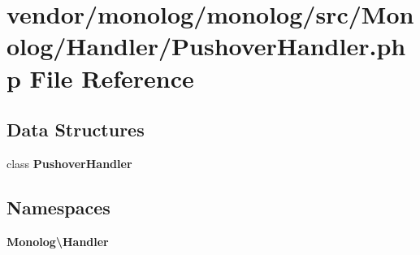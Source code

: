 \section{vendor/monolog/monolog/src/\+Monolog/\+Handler/\+Pushover\+Handler.php File Reference}
\label{_pushover_handler_8php}
\subsection*{Data Structures}
\begin{DoxyCompactItemize}
\item 
class {\bf Pushover\+Handler}
\end{DoxyCompactItemize}
\subsection*{Namespaces}
\begin{DoxyCompactItemize}
\item 
 {\bf Monolog\textbackslash{}\+Handler}
\end{DoxyCompactItemize}

